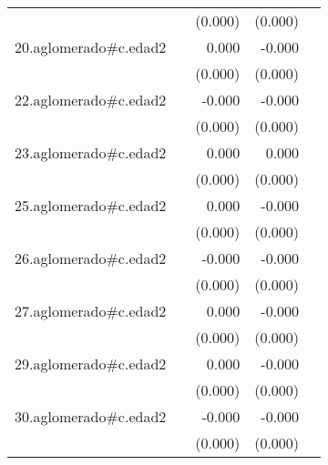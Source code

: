 {\begin{longtable}{l*{4}{D{.}{.}{-1}}}
            &                     &     (0.000)         &     (0.000)         &                     \\
\addlinespace
20.aglomerado#c.edad2&                     &       0.000         &      -0.000         &                     \\
            &                     &     (0.000)         &     (0.000)         &                     \\
\addlinespace
22.aglomerado#c.edad2&                     &      -0.000         &      -0.000\sym{*}  &                     \\
            &                     &     (0.000)         &     (0.000)         &                     \\
\addlinespace
23.aglomerado#c.edad2&                     &       0.000\sym{*}  &       0.000\sym{*}  &                     \\
            &                     &     (0.000)         &     (0.000)         &                     \\
\addlinespace
25.aglomerado#c.edad2&                     &       0.000         &      -0.000         &                     \\
            &                     &     (0.000)         &     (0.000)         &                     \\
\addlinespace
26.aglomerado#c.edad2&                     &      -0.000         &      -0.000         &                     \\
            &                     &     (0.000)         &     (0.000)         &                     \\
\addlinespace
27.aglomerado#c.edad2&                     &       0.000         &      -0.000         &                     \\
            &                     &     (0.000)         &     (0.000)         &                     \\
\addlinespace
29.aglomerado#c.edad2&                     &       0.000         &      -0.000         &                     \\
            &                     &     (0.000)         &     (0.000)         &                     \\
\addlinespace
30.aglomerado#c.edad2&                     &      -0.000         &      -0.000\sym{*}  &                     \\
            &                     &     (0.000)         &     (0.000)         &                     \\

\end{longtable}}
